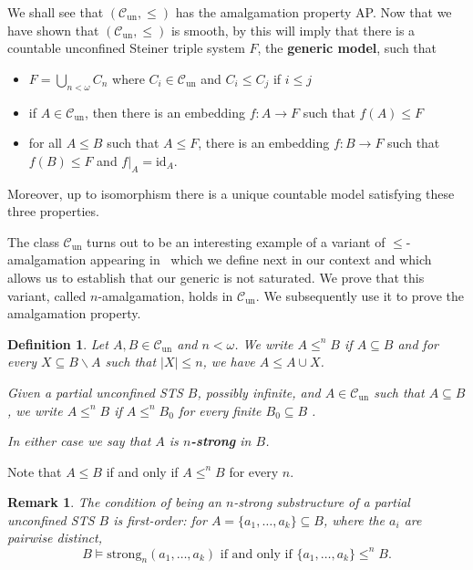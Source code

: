 \documentclass[a4paper, 11pt]{article}
\newcommand{\Cun}{\mathcal{C}_\mathrm{un}}
\newcommand{\strong}{\mathrm{strong}}
\theoremstyle{note}
\newtheorem{df}[thm]{Definition}
\newtheorem{rmk}[thm]{Remark}
\begin{document}
	 We shall see that 
$(\Cun, \leq)$ has the amalgamation property AP.  Now that we have shown that $(\Cun,\leq)$ is smooth, by \cite{kue-lask} this will imply that there is a countable unconfined Steiner triple system $F$, the \textbf{generic model}, such that
\begin{itemize}
\item $F = \bigcup_{n < \omega} C_n$ where $C_i \in \Cun$ and $C_i \leq C_j$ if $i\leq j$
\item if $A \in \Cun$, then there is an embedding $f:A \rightarrow F$ such that $f(A)\leq F$
\item for all $A \leq B$ such that $A \leq F$, there is an embedding $f: B \to F$ such that $f(B) \leq F$ and $f|_A = \mathrm{id}_A$.
\end{itemize}
Moreover, up to isomorphism there is a unique countable model satisfying these three properties.

 The class $\Cun$ turns out to be an interesting example of a variant of $\leq$-amalgamation appearing in~\cite{wagner} which we define next in our context and which allows us to establish that our generic is not saturated. We prove that this variant, called $n$-amalgamation, holds in $\Cun$. We subsequently use it to prove the amalgamation property.

\begin{df}  Let $A,B\in \Cun$ and $n<\omega$.   We write  $A\leq^n B$  if  $A \subseteq B$  and for every  $X\subseteq B\smallsetminus A$  such that  $|X|\leq n$, we have  $A\leq A\cup X$. 

Given  a partial unconfined STS $B$, possibly infinite, and $A\in \Cun$ such that   $A\subseteq B$, we write  $A\leq^n B$  if $A\leq^n B_0$ for every  finite $B_0\subseteq B$ . 

In either case we say that $A$ is \textbf{$n$-strong} in $B$. 
\end{df}
Note that $A\leq B$ if and only if $A\leq^n B$  for every $n$. 
\begin{rmk}\label{strongformula}
The condition of being an $n$-strong substructure of a partial unconfined STS $B$ is first-order: for $A=\{a_1, \ldots, a_k\} \subseteq B$, where the $a_i$ are pairwise distinct,
 $$B\models \strong_n(a_1,\ldots,a_k) \mbox{ if and only if } \{a_1,\ldots,a_k\}\leq^n B.$$
\end{rmk}
\end{document}

